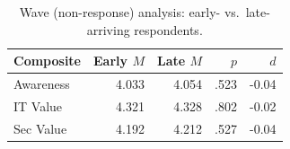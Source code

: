 \begin{table}[ht]
\centering
\caption{Wave (non-response) analysis: early- vs.\ late-arriving respondents.}
\label{tab:wave}
\small
\begin{tabular}{lrrrr}
\toprule
Composite & Early $M$ & Late $M$ & $p$ & $d$ \\
\midrule
Awareness & 4.033 & 4.054 & .523 & -0.04 \\
IT Value & 4.321 & 4.328 & .802 & -0.02 \\
Sec Value & 4.192 & 4.212 & .527 & -0.04 \\
\bottomrule
\end{tabular}
\end{table}
